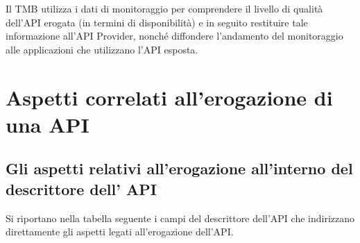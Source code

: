 \documentclass[letterpaper,10pt,italian]{sphinxmanual}
\begin{document}
Il TMB utilizza i dati di monitoraggio per comprendere il livello di qualità dell’API erogata (in termini di disponibilità) e in seguito restituire tale informazione all’API Provider, nonché diffondere l’andamento del monitoraggio alle applicazioni che utilizzano l’API esposta.


\section{Aspetti correlati all’erogazione di una API}
\label{\detokenize{sez25:aspetti-correlati-allerogazione-di-una-api}}\label{\detokenize{sez25::doc}}\label{\detokenize{sez25:sezione25}}



\subsection{Gli aspetti relativi all’erogazione all’interno del descrittore dell’ API}
\label{\detokenize{sez25:sezione251}}\label{\detokenize{sez25:gli-aspetti-relativi-allerogazione-allinterno-del-descrittore-dell-api}}
Si riportano nella tabella seguente i campi del descrittore dell’API che indirizzano direttamente gli aspetti legati all’erogazione dell’API.
\end{document}
